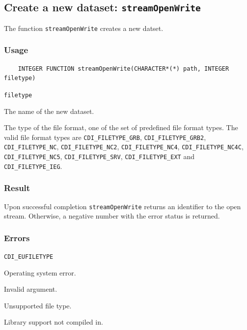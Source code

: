 

\subsection{Create a new dataset: \texttt{streamOpenWrite}}
\label{streamOpenWrite}

The function {\texttt{streamOpenWrite}} creates a new datset.
\subsubsection*{Usage}

\begin{verbatim}
    INTEGER FUNCTION streamOpenWrite(CHARACTER*(*) path, INTEGER filetype)
\end{verbatim}

\hspace*{4mm}\begin{minipage}[]{15cm}
\begin{deflist}{\texttt{filetype}\ }
\item[\texttt{path}]
The name of the new dataset.
\item[\texttt{filetype}]
The type of the file format, one of the set of predefined {\CDI} file format types.
                     The valid {\CDI} file format types are {\texttt{CDI\_FILETYPE\_GRB}}, {\texttt{CDI\_FILETYPE\_GRB2}}, {\texttt{CDI\_FILETYPE\_NC}},
                     {\texttt{CDI\_FILETYPE\_NC2}}, {\texttt{CDI\_FILETYPE\_NC4}}, {\texttt{CDI\_FILETYPE\_NC4C}}, {\texttt{CDI\_FILETYPE\_NC5}},
{\texttt{CDI\_FILETYPE\_SRV}},
                     {\texttt{CDI\_FILETYPE\_EXT}} and {\texttt{CDI\_FILETYPE\_IEG}}.

\end{deflist}
\end{minipage}

\subsubsection*{Result}

Upon successful completion {\texttt{streamOpenWrite}} returns an identifier to the
open stream. Otherwise, a negative number with the error status is returned.


\subsubsection*{Errors}


\hspace*{4mm}\begin{minipage}[]{15cm}
\begin{deflist}{\texttt{CDI\_EUFILETYPE}\ }
\item[\texttt{CDI\_ESYSTEM}]
Operating system error.
\item[\texttt{CDI\_EINVAL}]
Invalid argument.
\item[\texttt{CDI\_EUFILETYPE}]
Unsupported file type.
\item[\texttt{CDI\_ELIBNAVAIL}]
Library support not compiled in.
\end{deflist}
\end{minipage}



